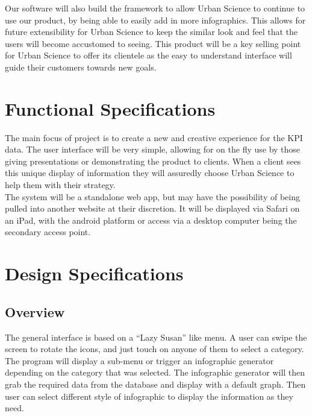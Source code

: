 \documentclass[11pt,a4paper,oneside]{article}
\begin{document}
Our software will also build the framework to allow Urban Science to continue to use our product, by being able to easily add in more infographics. This allows for future extensibility for Urban Science to keep the similar look and feel that the users will become accustomed to seeing. This product will be a key selling point for Urban Science to offer its clientele as the easy to understand interface will guide their customers towards new goals.\\


\section{Functional Specifications}

The main focus of project is to create a new and creative experience for the KPI data. The user interface will be very simple, allowing for on the fly use by those giving presentations or demonstrating the product to clients. When a client sees this unique display of information they will assuredly choose Urban Science to help them with their strategy.\\

The system will be a standalone web app, but may have the possibility of being pulled into another website at their discretion. It will be displayed via Safari on an iPad, with the android platform or access via a desktop computer being the secondary access point.\\


\section{Design Specifications}

\subsection{Overview}

The general interface is based on a “Lazy Susan” like menu. A user can swipe the screen to rotate the icons, and just touch on anyone of them to select a category. The program will display a sub-menu or trigger an infographic generator depending on the category that was selected. The infographic generator will then grab the required data from the database and display with a default graph. Then user can select different style of infographic to display the information as they need.\\
\end{document}
